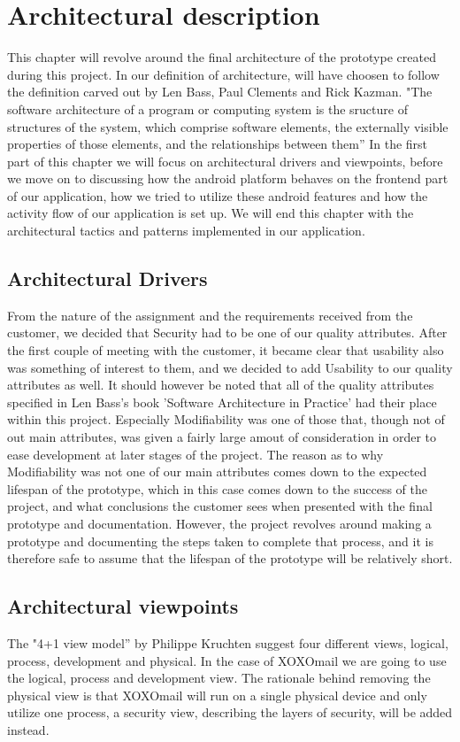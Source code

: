 \chapter{Architectural description}
	This chapter will revolve around the final architecture of the prototype created during this project. In our definition of architecture, will have choosen to follow the definition carved out by
	Len Bass, Paul Clements and Rick Kazman. "The software architecture of a program or computing system is the sructure of structures of the system, which comprise software elements, the externally visible properties of those elements, and the relationships between them''\cite[p. 3]{bib:archi}
	In the first part of this chapter we will focus on architectural drivers and viewpoints, before we move on to discussing how the android platform behaves on the frontend part of our application, how we tried to utilize these android features and how the activity flow of our application is set up. We will end this chapter with the architectural tactics and patterns implemented in our application. 
	
\section{Architectural Drivers}
	From the nature of the assignment and the requirements received from the customer, we decided that Security had to be one of our quality attributes. After the first couple of meeting with the customer, it became clear that usability also was something of interest to them, and we decided to add Usability to our quality attributes as well. It should however be noted that	all of the quality attributes specified in Len Bass's book 'Software Architecture in Practice'\cite{bib:archi} had their place within this project. Especially Modifiability was one of those that, though not of out main attributes, was given a fairly large amout of consideration in order to ease development at later stages of the project. The reason as to why Modifiability was not one of our main attributes comes down to the expected lifespan of the prototype, which in this case comes down to the success of the project, and what conclusions the customer sees when presented with the final prototype and documentation. However, the project revolves around making a prototype and documenting the steps taken to complete that process, and it is therefore safe to assume that the lifespan of the prototype will be relatively short. 

\section{Architectural viewpoints}
The "4+1 view model'' \cite{bib:vm} by Philippe Kruchten suggest four different views, logical, process, development and physical. In the case of XOXOmail we are going to use the logical, process and development view. The rationale behind removing the physical view is that XOXOmail will run on a single physical device and only utilize one process, a security view, describing the layers of security, will be added instead.

